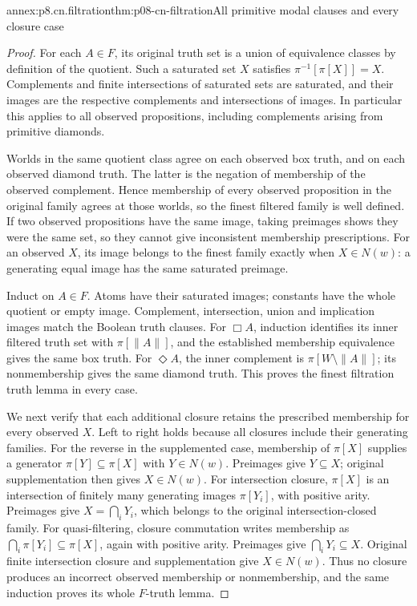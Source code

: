 \begin{annexitem}{annex:p8.cn.filtration}{thm:p08-cn-filtration}{All primitive modal clauses and every closure case}
\begin{proof}
For each \(A\in F\), its original truth set is a union of
equivalence classes by definition of the quotient. Such a saturated
set \(X\) satisfies \(\pi^{-1}[\pi[X]]=X\).
Complements and finite intersections of saturated sets are saturated,
and their images are the respective complements and intersections
of images. In particular this applies to all observed propositions,
including complements arising from primitive diamonds.

Worlds in the same quotient class agree on each observed box truth,
and on each observed diamond truth. The latter is the negation of
membership of the observed complement. Hence membership of every
observed proposition in the original family agrees at those worlds,
so the finest filtered family is well defined. If two observed
propositions have the same image, taking preimages shows they were
the same set, so they cannot give inconsistent membership prescriptions.
For an observed \(X\), its image belongs to the finest family
exactly when \(X\in N(w)\): a generating equal image has the
same saturated preimage.

Induct on \(A\in F\). Atoms have their saturated images;
constants have the whole quotient or empty image. Complement,
intersection, union and implication images match the Boolean truth
clauses. For \(\Box A\), induction identifies its inner filtered
truth set with \(\pi[\|A\|]\), and the established membership
equivalence gives the same box truth. For \(\Diamond A\),
the inner complement is \(\pi[W\setminus\|A\|]\);
its nonmembership gives the same diamond truth. This proves the
finest filtration truth lemma in every case.

We next verify that each additional closure retains the prescribed
membership for every observed \(X\). Left to right holds because
all closures include their generating families. For the reverse
in the supplemented case, membership of \(\pi[X]\) supplies
a generator \(\pi[Y]\subseteq\pi[X]\) with \(Y\in N(w)\).
Preimages give \(Y\subseteq X\); original supplementation
then gives \(X\in N(w)\).
For intersection closure, \(\pi[X]\) is an intersection of
finitely many generating images \(\pi[Y_i]\), with positive
arity. Preimages give \(X=\bigcap_iY_i\), which belongs to
the original intersection-closed family. For quasi-filtering,
closure commutation writes membership as
\(\bigcap_i\pi[Y_i]\subseteq\pi[X]\), again with positive
arity. Preimages give \(\bigcap_iY_i\subseteq X\).
Original finite intersection closure and supplementation give
\(X\in N(w)\). Thus no closure produces an incorrect
observed membership or nonmembership, and the same induction
proves its whole \(F\)-truth lemma.


\end{proof}
\end{annexitem}
